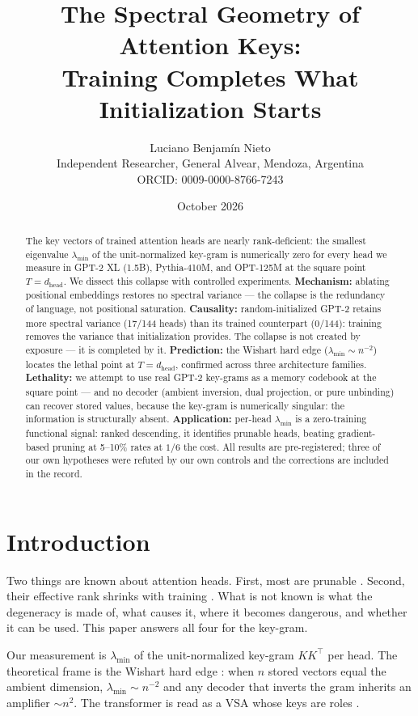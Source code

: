 \documentclass[11pt]{article}
\title{The Spectral Geometry of Attention Keys:\\
Training Completes What Initialization Starts}
\author{Luciano Benjam\'in Nieto\\
Independent Researcher, General Alvear, Mendoza, Argentina\\
ORCID: 0009-0000-8766-7243}
\date{October 2026}
\begin{document}
\maketitle

\begin{abstract}
The key vectors of trained attention heads are nearly rank-deficient: the
smallest eigenvalue $\lambda_{\min}$ of the unit-normalized key-gram is
numerically zero for every head we measure in GPT-2 XL (1.5B), Pythia-410M,
and OPT-125M at the square point $T = d_{\text{head}}$. We dissect this
collapse with controlled experiments. \textbf{Mechanism:} ablating
positional embeddings restores no spectral variance --- the collapse is
the redundancy of language, not positional saturation. \textbf{Causality:}
random-initialized GPT-2 retains more spectral variance (17/144 heads)
than its trained counterpart (0/144): training removes the variance that
initialization provides. The collapse is not created by exposure --- it
is completed by it. \textbf{Prediction:} the Wishart hard edge
($\lambda_{\min} \sim n^{-2}$) locates the lethal point at
$T = d_{\text{head}}$, confirmed across three architecture families.
\textbf{Lethality:} we attempt to use real GPT-2 key-grams as a memory
codebook at the square point --- and no decoder (ambient inversion, dual
projection, or pure unbinding) can recover stored values, because the
key-gram is numerically singular: the information is structurally absent.
\textbf{Application:} per-head $\lambda_{\min}$ is a zero-training
functional signal: ranked descending, it identifies prunable heads,
beating gradient-based pruning at 5--10\% rates at $1/6$ the cost.
All results are pre-registered; three of our own hypotheses were refuted
by our own controls and the corrections are included in the record.
\end{abstract}

\section{Introduction}

Two things are known about attention heads. First, most are prunable
\citep{michel2019sixteen,voita2019analyzing}. Second, their effective rank
shrinks with training \citep{loki2024,eigenattn2024,staterank2026}. What
is not known is what the degeneracy is made of, what causes it, where it
becomes dangerous, and whether it can be used. This paper answers all
four for the key-gram.

Our measurement is $\lambda_{\min}$ of the unit-normalized key-gram
$K K^\top$ per head. The theoretical frame is the Wishart hard edge
\citep{edelman1988eigenvalues,chen2010hard}: when $n$ stored vectors
equal the ambient dimension, $\lambda_{\min} \sim n^{-2}$ and any
decoder that inverts the gram inherits an amplifier $\sim n^2$. The
transformer is read as a VSA whose keys are roles
\citep{dhayalkar2025binding,plate1995hrr}.
\end{document}
